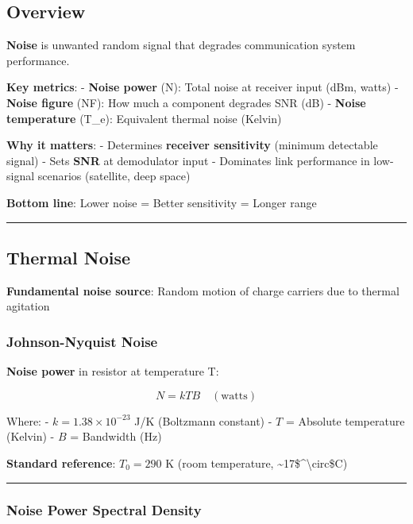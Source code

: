 \subsection{Overview}\label{overview}

\textbf{Noise} is unwanted random signal that degrades communication
system performance.

\textbf{Key metrics}: - \textbf{Noise power} (N): Total noise at
receiver input (dBm, watts) - \textbf{Noise figure} (NF): How much a
component degrades SNR (dB) - \textbf{Noise temperature} (T\_e):
Equivalent thermal noise (Kelvin)

\textbf{Why it matters}: - Determines \textbf{receiver sensitivity}
(minimum detectable signal) - Sets \textbf{SNR} at demodulator input -
Dominates link performance in low-signal scenarios (satellite, deep
space)

\textbf{Bottom line}: Lower noise = Better sensitivity = Longer range

\begin{center}\rule{0.5\linewidth}{0.5pt}\end{center}

\subsection{Thermal Noise}\label{thermal-noise}

\textbf{Fundamental noise source}: Random motion of charge carriers due
to thermal agitation

\subsubsection{Johnson-Nyquist Noise}\label{johnson-nyquist-noise}

\textbf{Noise power} in resistor at temperature T:

\[
N = k T B \quad (\text{watts})
\]

Where: - \(k = 1.38 \times 10^{-23}\) J/K (Boltzmann constant) - \(T\) =
Absolute temperature (Kelvin) - \(B\) = Bandwidth (Hz)

\textbf{Standard reference}: \(T_0 = 290\) K (room temperature,
\textasciitilde17\$\^{}\textbackslash circ\$C)

\begin{center}\rule{0.5\linewidth}{0.5pt}\end{center}

\subsubsection{Noise Power Spectral
Density}\label{noise-power-spectral-density}

